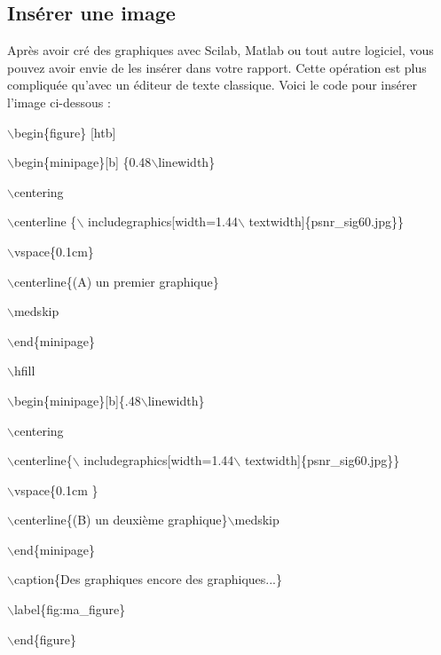 \documentclass[11pt]{article}
\theoremstyle{remark}
\theoremstyle{definition}
\begin{document}

\subsection{Insérer une image }

Après avoir cré des graphiques avec Scilab, Matlab ou tout autre logiciel,  vous pouvez avoir envie de les insérer dans votre rapport. Cette opération est plus compliquée qu'avec un éditeur de texte classique. Voici le code pour insérer l'image ci-dessous : \medskip

$\backslash$begin\{figure\} [htb]

$\backslash$begin\{minipage\}[b] \{0.48$\backslash$linewidth\}

$\backslash$centering

$\backslash$centerline \{$\backslash$ includegraphics[width=1.44$\backslash$ textwidth]\{psnr\_sig60.jpg\}\}

$\backslash$vspace\{0.1cm\}

$\backslash$centerline\{(A) un premier graphique\}

$\backslash$medskip

$\backslash$end\{minipage\}

$\backslash$hfill

$\backslash$begin\{minipage\}[b]\{.48$\backslash$linewidth\}

$\backslash$centering

$\backslash$centerline\{$\backslash$ includegraphics[width=1.44$\backslash$ textwidth]\{psnr\_sig60.jpg\}\}

$\backslash$vspace\{0.1cm \}

$\backslash$centerline\{(B) un deuxième graphique\}$\backslash$medskip

$\backslash$end\{minipage\}

$\backslash$caption\{Des graphiques encore des graphiques...\}

$\backslash$label\{fig:ma\_figure\}

$\backslash$end\{figure\} \medskip
\end{document}
